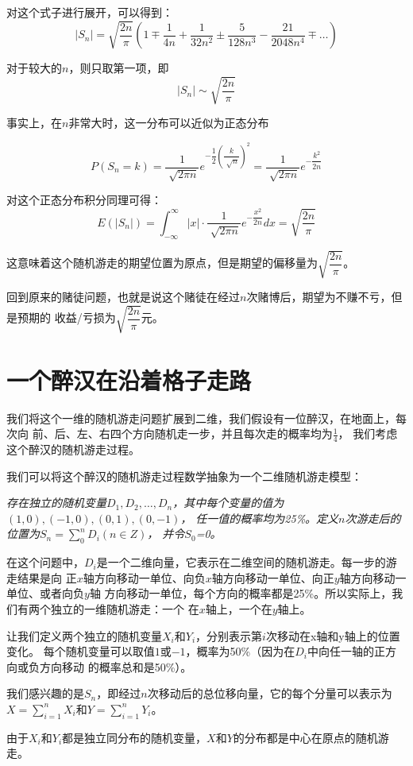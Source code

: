 \documentclass{article}
\newcommand\df[2]{\dfrac{#1}{#2}}
\begin{document}
对这个式子进行展开，可以得到：$$|S_n|=\sqrt{\df{2n}{\pi}}(1\mp\df{1}{4n}+\df{1}{32n^2}\pm\df{5}{128n^3}-\df{21}{2048n^4}\mp\dots)$$

对于较大的$n$，则只取第一项，即$$|S_n|\sim\sqrt{\df{2n}{\pi}}$$

事实上，在$n$非常大时，这一分布可以近似为正态分布

$$P(S_n=k)=\df{1}{\sqrt[]{2\pi n}}e^{-\df{1}{2}\left(\df{k}{\sqrt[]{n}}\right)^2}=\df{1}{\sqrt[]{2\pi n}}e^{-\df{k^2}{2n}}$$

对这个正态分布积分同理可得：$$E(|S_n|)=\int_{-\infty}^{\infty}|x|\cdot\df{1}{\sqrt[]{2\pi n}}e^{-\df{x^2}{2n}}dx=\sqrt{\df{2n}{\pi}}$$

这意味着这个随机游走的期望位置为原点，但是期望的偏移量为$\sqrt{\df{2n}{\pi}}$。

回到原来的赌徒问题，也就是说这个赌徒在经过$n$次赌博后，期望为不赚不亏，但是预期的
收益/亏损为$\sqrt{\df{2n}{\pi}}$元。

\section{一个醉汉在沿着格子走路}

我们将这个一维的随机游走问题扩展到二维，我们假设有一位醉汉，在地面上，每次向
前、后、左、右四个方向随机走一步，并且每次走的概率均为$\frac{1}{4}$，
我们考虑这个醉汉的随机游走过程。

我们可以将这个醉汉的随机游走过程数学抽象为一个二维随机游走模型：

\emph{存在独立的随机变量$D_1,D_2,\dots,D_n$，其中每个变量的值为$(1,0),(-1,0),(0,1),(0,-1)$，
任一值的概率均为25\%。定义$n$次游走后的位置为$S_n=\sum_{0}^{n}D_i(n\in Z)$，
并令$S_0$=0。}

在这个问题中，$D_i$是一个二维向量，它表示在二维空间的随机游走。每一步的游走结果是向
正$x$轴方向移动一单位、向负$x$轴方向移动一单位、向正$y$轴方向移动一单位、或者向负$y$轴
方向移动一单位，每个方向的概率都是25\%。所以实际上，我们有两个独立的一维随机游走：一个
在$x$轴上，一个在$y$轴上。

让我们定义两个独立的随机变量$X_i$和$Y_i$，分别表示第$i$次移动在x轴和y轴上的位置变化。
每个随机变量可以取值$1$或$-1$，概率为50\%（因为在$D_i$中向任一轴的正方向或负方向移动
的概率总和是50\%）。

我们感兴趣的是$S_n$，即经过$n$次移动后的总位移向量，它的每个分量可以表示为$X = \sum_{i=1}^{n} X_i$和$Y = \sum_{i=1}^{n} Y_i$。

由于$X_i$和$Y_i$都是独立同分布的随机变量，$X$和$Y$的分布都是中心在原点的随机游走。
\end{document}
